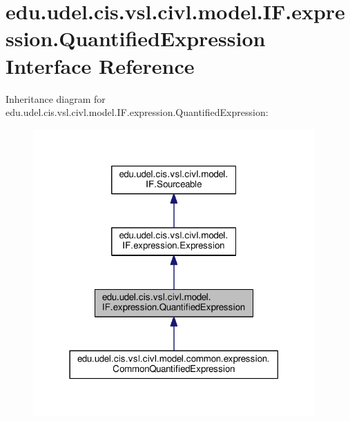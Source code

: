 \hypertarget{interfaceedu_1_1udel_1_1cis_1_1vsl_1_1civl_1_1model_1_1IF_1_1expression_1_1QuantifiedExpression}{}\section{edu.\+udel.\+cis.\+vsl.\+civl.\+model.\+I\+F.\+expression.\+Quantified\+Expression Interface Reference}
\label{interfaceedu_1_1udel_1_1cis_1_1vsl_1_1civl_1_1model_1_1IF_1_1expression_1_1QuantifiedExpression}


Inheritance diagram for edu.\+udel.\+cis.\+vsl.\+civl.\+model.\+I\+F.\+expression.\+Quantified\+Expression\+:
\nopagebreak
\begin{figure}[H]
\begin{center}
\leavevmode
\includegraphics[width=306pt]{interfaceedu_1_1udel_1_1cis_1_1vsl_1_1civl_1_1model_1_1IF_1_1expression_1_1QuantifiedExpression__inherit__graph}
\end{center}
\end{figure}


